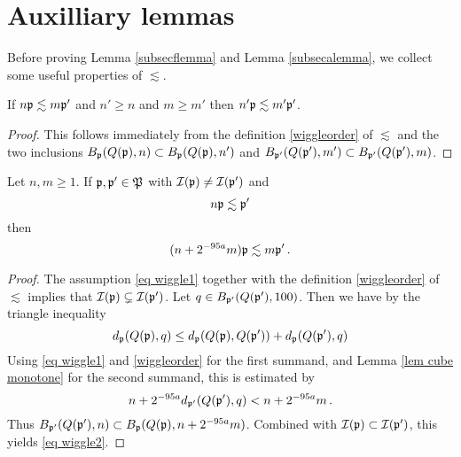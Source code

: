 \section{Auxilliary lemmas}

Before proving Lemma \ref{subsecflemma} and Lemma \ref{subsecalemma}, we collect some useful properties of $\lesssim$.

\begin{lemma}
    \label{lem wiggle monotone}
    If $n\mathfrak p \lesssim m\mathfrak p'$ and
    $n' \ge  n$ and $m \ge m'$ then $n'\mathfrak p \lesssim m'\mathfrak p'$.
\end{lemma}

\begin{proof}
    This follows immediately from the definition \eqref{wiggleorder} of $\lesssim$ and the two inclusions $B_{\mathfrak p}(Q(\mathfrak p), n) \subset B_{\mathfrak p}(Q(\mathfrak p), n')$ and $B_{\mathfrak p'}(Q(\mathfrak p'), m') \subset B_{\mathfrak p'}(Q(\mathfrak p'), m)$.
\end{proof}

\begin{lemma}
    \label{lem aux wiggle}
    Let $n, m \ge 1$.
    If $\mathfrak p, \mathfrak p' \in \mathfrak P$ with $\mathcal{I}(\mathfrak p) \ne \mathcal{I}(\mathfrak p')$ and
    \begin{equation}
        \label{eq wiggle1}
        n \mathfrak p \lesssim \mathfrak p'
    \end{equation}
    then
    \begin{equation}
        \label{eq wiggle2}
        (n + 2^{-95 a} m) \mathfrak p \lesssim m\mathfrak p'\,.
    \end{equation}
\end{lemma}

\begin{proof}
    The assumption \eqref{eq wiggle1} together with the definition \eqref{wiggleorder} of $\lesssim$ implies that $\mathcal{I}(\mathfrak p) \subsetneq \mathcal{I}(\mathfrak p')$. Let $q \in B_{\mathfrak p'}(Q(\mathfrak p'), 100)$.  Then we have by the triangle inequality
    $$
        d_{\mathfrak p}(Q(\mathfrak p), q) \le  d_{\mathfrak p}(Q(\mathfrak p), Q(\mathfrak p')) +  d_{\mathfrak p}(Q(\mathfrak p'), q)
    $$
    Using \eqref{eq wiggle1} and \eqref{wiggleorder} for the first summand, and Lemma \ref{lem cube monotone} for the second summand, this is estimated by
    $$
        n + 2^{-95a} d_{\mathfrak p'}(Q(\mathfrak p'), q) < n + 2^{-95a} m\,.
    $$
    Thus $B_{\mathfrak p'}(Q(\mathfrak p'),n) \subset B_{\mathfrak p}(Q(\mathfrak p),n + 2^{-95a}m)$. Combined with $\mathcal{I}(\mathfrak p) \subset \mathcal{I}(\mathfrak p')$, this yields \eqref{eq wiggle2}.
\end{proof}

